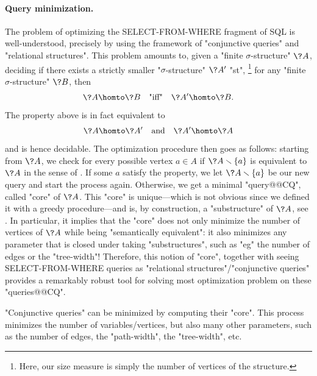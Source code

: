\paragraph*{Query minimization.}
The problem of optimizing the \textsf{SELECT-FROM-WHERE} fragment of
SQL is well-understood, precisely by using the framework of "conjunctive queries"
and "relational structures".
This problem amounts to, given a "finite $\sigma$-structure" $\?A$,
deciding if there exists a strictly smaller "$\sigma$-structure" $\?A'$ "st",%
\footnote{Here, our size measure is simply the number of vertices of the structure.}
for any "finite $\sigma$-structure" $\?B$, then
\[
	\?A \homto \?B
	\quad\text{"iff"}\quad
	\?A' \homto \?B.
\]
The property above is in fact equivalent to
\begin{equation}
	\?A \homto \?A'
	\quad\text{and}\quad
	\?A' \homto \?A
	\label{eq:intro-hom-equivalence}
\end{equation}
and is hence decidable.
The optimization procedure then goes as follows:
starting from $\?A$, we check for every possible vertex $a \in A$
if $\?A \smallsetminus \{a\}$ is equivalent to $\?A$ in the sense of
. If some $a$ satisfy the property, we
let $\?A \smallsetminus \{a\}$ be our new query and start the process again.
Otherwise, we get a minimal "query@@CQ", called "core" of $\?A$.
This "core" is unique---which is not obvious since we defined it with
a greedy procedure---and is, by construction, a "substructure" of $\?A$,
see .
In particular, it implies that the "core" does not only minimize the number of
vertices of $\?A$ while being "semantically equivalent": it also minimizes any
parameter that is closed under taking "substructures", such as "eg"
the number of edges or the "tree-width"!
Therefore, this notion of "core", together with seeing
\textsf{SELECT-FROM-WHERE} queries as "relational structures"/"conjunctive queries"
provides a remarkably robust tool for solving most optimization problem on these "queries@@CQ".

\begin{known}
	"Conjunctive queries" can be minimized by computing their "core".
	This process minimizes the number of variables/vertices, but also many other
	parameters, such as the number of edges, the "path-width", the "tree-width", etc.
\end{known}

